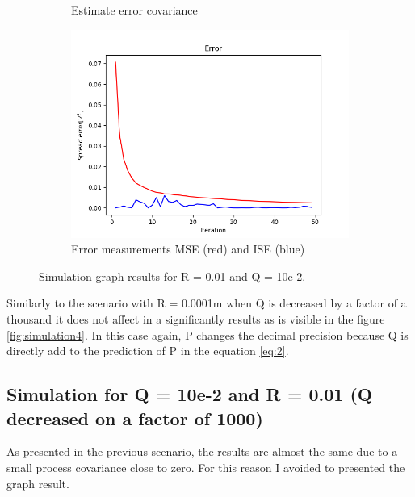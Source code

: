 \documentclass{article}
\begin{document}
\begin{figure}[H]
\begin{subfigure} {.5\textwidth}
            \caption{Estimate error covariance}
        \end{subfigure}
        \begin{subfigure}{.5\textwidth}            
            \centering
            \includegraphics[width=0.6\linewidth]{./img/r01q-2_E.png}
            \caption{Error measurements MSE (red) and ISE (blue)}
        \end{subfigure}
        \caption{Simulation graph results for R = 0.01 and Q = 10e-2.}
        \label{fig:simulation5}
    \end{figure}
     
    Similarly to the scenario with R = 0.0001m when Q is decreased by a factor of a thousand it does not 
    affect in a significantly results as is visible in the figure \ref{fig:simulation4}. In this case
    again, P changes the decimal precision because Q is directly add to the prediction of P in the equation 
    \ref{eq:2}.

    \subsection{Simulation for Q = 10e-2 and R = 0.01 (Q decreased on a factor of 1000)}
    
    As presented in  the previous scenario, the results are almost the same due to a small process covariance close to zero.
    For this reason I avoided to presented the graph result.
\end{document}
